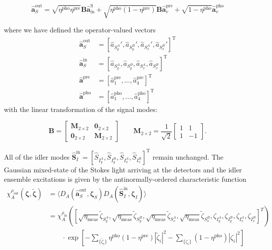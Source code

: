 \documentclass[aps,twocolumn,secnumarabic,amsmath,amssymb,pra,groupedaddress,
showpacs, showkeys]{revtex4-1}
\newcommand{\pna}[1]{\left(#1\right)}
\newcommand{\pnb}[1]{\left[#1\right]}
\newcommand{\eqn}[1]{
\begin{equation}
	#1
\end{equation}
}
\begin{document}
\eqn{
\mathbf{\hat{a}}^{\textrm{out}}_S= 
\sqrt{\eta^{\textrm{pho}}\eta^{\textrm{pre}}} \mathbf{B} \mathbf{\hat{a}}^{\textrm{S}}_{\textrm{in}}
+\sqrt{\eta^{\textrm{pho}}\pna{1-\eta^{\textrm{pre}}}}\mathbf{B} \mathbf{\hat{a}}^{\textrm{pre}}_v
+\sqrt{1-\eta^{\textrm{pho}}}\mathbf{\hat{a}}^{\textrm{pho}}_v
}
where we have defined the operator-valued vectors
\begin{align}
	\mathbf{\hat{a}}^{\textrm{out}}_S&=\pnb{\hat{a}_{S^A_y}',\hat{a}_{S^B_y}',\hat{a}_{S^A_x}',\hat{a}_{S^B_x}'}^{\textrm{T}} \nonumber\\
	\mathbf{\hat{a}}_{S}^{\textrm{in}}&=\pnb{\hat{a}_{S^A_y},\hat{a}_{S^B_y},\hat{a}_{S^A_x},\hat{a}_{S^B_x}}^{\textrm{T}} \nonumber\\
	\mathbf{\hat{a}}^{\textrm{pre}}&=\pnb{\hat{a}_1^{\textrm{pre}},\ldots, \hat{a}_4^{\textrm{pre}}}^{\textrm{T}} \nonumber\\
	\mathbf{\hat{a}}^{\textrm{pho}}&=\pnb{\hat{a}^{\textrm{pho}}_1,\ldots, \hat{a}^{\textrm{pho}}_4}^{\textrm{T}}
\end{align}
with the linear transformation of the signal modes:
\eqn{ 
\mathbf{B}=
\left[ 
\begin{array}{cc}
\mathbf{M}_{2\times 2} & \mathbf{0}_{2\times 2} \\
\mathbf{0}_{2\times 2} & \mathbf{M}_{2\times 2}
\end{array} 
\right]
\qquad 
\mathbf{M}_{2\times 2}=
\frac{1}{\sqrt{2}}\left[ 
\begin{array}{cc}
1 & 1 \\
1 & -1\end{array} \right].\label{eqn:chap3:linear_beamsplitter}}
All of the idler modes
$\mathbf{\hat{S}}_{{I}}^{\textrm{in}}=\pnb{\hat{S}_{I^A_y},\hat{S}_{I^B_y},\hat{S}_{I^A_x},\hat{S}_{I^B_x}}^{\textrm{T}}$
remain unchanged. The Gaussian mixed-state of the Stokes light arriving at the
detectors and the idler ensemble excitations is given by the
antinormally-ordered characteristic function
\begin{align}
	\chi_A^{\rho_{\textrm{out}}}\pna{\bm{\zeta}, \bm{\tilde{\zeta}}}
	& =\langle D_A\pna{\mathbf{\hat{a}}_S^{\textrm{out}}, \bm{\zeta}_S} D_A\pna{\mathbf{\hat{S}}_I^{\textrm{in}}, \bm{\zeta}_I} \rangle\nonumber \\
	& = \chi_A^{\rho_{\textrm{in}}}\pna{\pnb{\sqrt{\eta_{\textrm{meas}}}\tilde{\zeta}_{S^A_y},\sqrt{\eta_{\textrm{meas}}}\tilde{\zeta}_{S^B_y},\sqrt{\eta_{\textrm{meas}}}\tilde{\zeta}_{S^A_x},\sqrt{\eta_{\textrm{meas}}}\tilde{\zeta}_{S^B_x},
    \zeta_{I^A_y},\zeta_{I^B_y},\zeta_{I^A_x},\zeta_{I^B_x}}^{T}} \nonumber \\
    & \qquad \cdot \exp\pnb{-\sum_{\{\tilde{\zeta}_i\}}\eta^{\textrm{pho}}\pna{1- \eta^{\textrm{pre}}}|\tilde{\zeta}_i|^2-\sum_{\{{\zeta}_i\}}\pna{1-\eta^{\textrm{pho}}}|{\zeta}_i|^2} \label{eqn:chap3:chia_orig}
\end{align}
\end{document}
